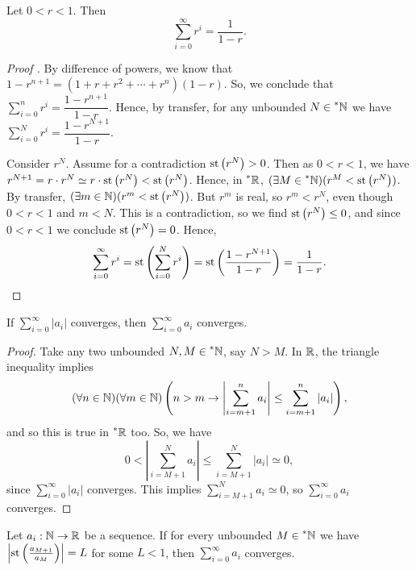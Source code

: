 \begin{thm}\label{GeometricSeries}
    Let $0 < r < 1$. Then 
    \[ \sum_{i = 0}^\infty r^i = \frac{1}{1-r}. \]
\end{thm}

\begin{proof}[Proof ]
    By difference of powers, we know that $1 - r^{n+1} = (1 + r + r^2 + \cdots + r^n)(1-r)$. So, we conclude that $\sum_{i=0}^n r^i = \dfrac{1-r^{n+1}}{1-r}$. Hence, by transfer, for any unbounded $N \in \prescript{*}{}{\mathbb{N}}$ we have $\sum_{i=0}^N r^i = \dfrac{1-r^{N+1}}{1-r}$. 

    Consider $r^{N}$. Assume for a contradiction $\operatorname{st}\left(r^N\right) > 0$. Then as $0 < r < 1$, we have $r^{N+1} = r \cdot r^N \simeq r\cdot \operatorname{st}\left(r^N\right) < \operatorname{st}\left(r^N\right)$. Hence, in $\prescript{*}{}{\mathbb{R}}$, $(\exists M \in \prescript{*}{}{\mathbb{N}})(r^M < \operatorname{st}\left(r^N\right))$. By transfer, $(\exists m \in \mathbb{N})(r^m < \operatorname{st}\left(r^N\right))$. But $r^m$ is real, so $r^m < r^N$, even though $0 < r < 1$ and $m < N$. This is a contradiction, so we find $\operatorname{st}\left(r^N\right) \leq 0$, and since $0 < r < 1$ we conclude $\operatorname{st}\left(r^N\right) = 0$. Hence, 
    \[\sum_{i=0}^\infty r^i = \operatorname{st}\left(\sum_{i=0}^N r^i\right) = \operatorname{st}\left(\frac{1-r^{N+1}}{1-r}\right) = \frac{1}{1-r}. \]
\end{proof}

\begin{thm}\label{AbsoluteConvergenceImpliesConvergence}
    If $\sum_{i = 0}^\infty |a_i|$ converges, then $\sum_{i = 0}^\infty a_i$ converges.
\end{thm}

\begin{proof}
    Take any two unbounded $N, M \in \prescript{*}{}{\mathbb{N}}$, say $N > M$. In $\mathbb{R}$, the triangle inequality implies \[(\forall n \in \mathbb{N})(\forall m \in \mathbb{N})\left(n > m \to \left|\sum_{i = m + 1}^n a_i \right| \leq \sum_{i = m + 1}^n  |a_i|\right),\]
    and so this is true in $\prescript{*}{}{\mathbb{R}}$ too. So, we have 
    \[0 < \left|\sum_{i=M+1}^N a_i\right| \leq \sum_{i=M+1}^N |a_i| \simeq 0,\]
    since $\sum_{i=0}^\infty |a_i|$ converges. This implies $\sum_{i=M+1}^N a_i \simeq 0$, so $\sum_{i=0}^\infty a_i$ converges.
\end{proof}

\begin{thm}\label{RatioTest}
    Let $a_i: \mathbb{N} \to \mathbb{R}$ be a sequence. If for every unbounded $M \in \prescript{*}{}{\mathbb{N}}$ we have $\left|\operatorname{st}\left(\frac{a_{M+1}}{a_M}\right)\right| = L$ for some $L < 1$, then $\sum_{i=0}^\infty a_i$ converges.
\end{thm}

